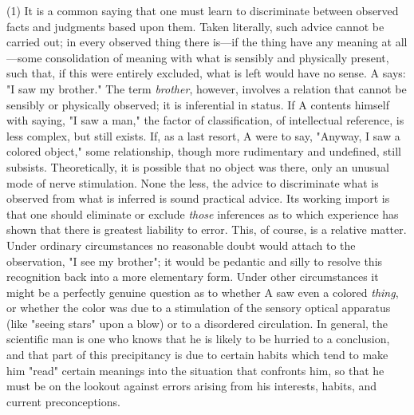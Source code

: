 \documentclass[letterpaper]{book}
\begin{document}
(1) It is a common saying that one must learn to discriminate between
observed facts and judgments based upon them. Taken literally, such
advice cannot be carried out; in every observed thing there is---if the
thing have any meaning at all---some consolidation of meaning with what
is sensibly and physically present, such that, if this were entirely
excluded, what is left would have no sense. A says: "I saw my brother."
The term \emph{brother}, however, involves a relation that cannot be
sensibly or physically observed; it is inferential in status. If A
contents himself with saying, "I saw a man," the factor of
classification, of intellectual reference, is less complex, but still
exists. If, as a last resort, A were to say, "Anyway, I saw a colored
object," some relationship, though more rudimentary and undefined, still
subsists. Theoretically, it is possible that
no
object was there, only an unusual mode of nerve stimulation. None the
less, the advice to discriminate what is observed from what is inferred
is sound practical advice. Its working import is that one should
eliminate or exclude \emph{those} inferences as to which experience has
shown that there is greatest liability to error. This, of course, is a
relative matter. Under ordinary circumstances no reasonable doubt would
attach to the observation, "I see my brother"; it would be pedantic and
silly to resolve this recognition back into a more elementary form.
Under other circumstances it might be a perfectly genuine question as to
whether A saw even a colored \emph{thing}, or whether the color was due
to a stimulation of the sensory optical apparatus (like "seeing stars"
upon a blow) or to a disordered circulation. In general, the scientific
man is one who knows that he is likely to be hurried to a conclusion,
and that part of this precipitancy is due to certain habits which tend
to make him "read" certain meanings into the situation that confronts
him, so that he must be on the lookout against errors arising from his
interests, habits, and current preconceptions.

\end{document}
